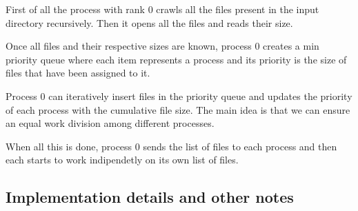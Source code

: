 First of all the process with rank 0 crawls all the files present in the input directory recursively. Then it opens all the files and reads their size.

Once all files and their respective sizes are known, process 0 creates  a min priority queue where each item represents a process and its priority is the  size of files that have been assigned to it.

Process 0 can iteratively insert files in the priority queue and updates the priority of each process with the cumulative file size. The main idea is that we can ensure an equal work division among different processes. 

When all this is done, process 0 sends the list of files to each process and then each starts to work indipendetly on its own list of files.



\subsection{Implementation details and other notes}

